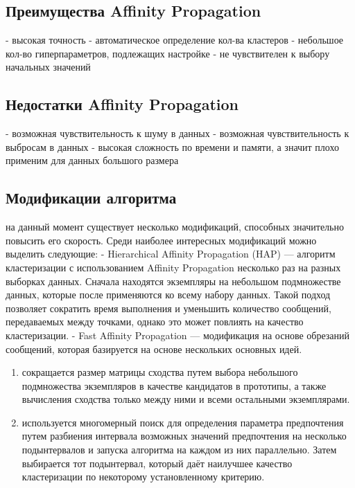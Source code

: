 \subsection{Преимущества Affinity Propagation}
- высокая точность
\newline
- автоматическое определение кол-ва кластеров
\newline
- небольшое кол-во гиперпараметров, подлежащих настройке
\newline
- не чувствителен к выбору начальных значений

\subsection{Недостатки Affinity Propagation}
- возможная чувствительность к шуму в данных
- возможная чувствительность к выбросам в данных
\newline
- высокая сложность по времени и памяти, а значит плохо применим для данных большого размера

\subsection{Модификации алгоритма}

на данный момент существует несколько модификаций, способных значительно повысить его скорость. Среди наиболее интересных модификаций можно выделить следующие:
\newline
\newline
- Hierarchical Affinity Propagation (HAP) — алгоритм кластеризации с использованием Affinity Propagation несколько раз на разных выборках данных. Сначала находятся экземпляры на небольшом подмножестве данных, которые после применяются ко всему набору данных. Такой подход позволяет сократить время выполнения и уменьшить количество сообщений, передаваемых между точками, однако это может повлиять на качество кластеризации.
\newline
\newline
- Fast Affinity Propagation — модификация на основе обрезаний сообщений, которая базируется на основе нескольких основных идей. 
\begin{enumerate}
    \item сокращается размер матрицы сходства путем выбора небольшого подмножества экземпляров в качестве кандидатов в прототипы, а также вычисления сходства только между ними и всеми остальными экземплярами.
          
    \item используется многомерный поиск для определения параметра предпочтения путем разбиения интервала возможных значений предпочтения на несколько подынтервалов и запуска алгоритма на каждом из них параллельно. Затем выбирается тот подынтервал, который даёт наилучшее качество кластеризации по некоторому установленному критерию.
          
\end{enumerate}


